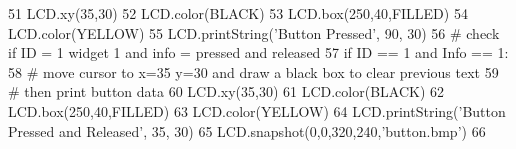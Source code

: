 \begin{DoxyCodeInclude}
51         LCD.xy(35,30)
52         LCD.color(BLACK)
53         LCD.box(250,40,FILLED)
54         LCD.color(YELLOW)
55         LCD.printString(\textcolor{stringliteral}{'Button Pressed'}, 90, 30)
56     \textcolor{comment}{# check if ID = 1 widget 1 and info = pressed and released}
57     \textcolor{keywordflow}{if} ID == 1 \textcolor{keywordflow}{and} Info == 1:
58         \textcolor{comment}{# move cursor to x=35 y=30 and draw a black box to clear previous text}
59         \textcolor{comment}{# then print button data}
60         LCD.xy(35,30)
61         LCD.color(BLACK)
62         LCD.box(250,40,FILLED)
63         LCD.color(YELLOW)        
64         LCD.printString(\textcolor{stringliteral}{'Button Pressed and Released'}, 35, 30)
65         LCD.snapshot(0,0,320,240,\textcolor{stringliteral}{'button.bmp'})
66         
\end{DoxyCodeInclude}


